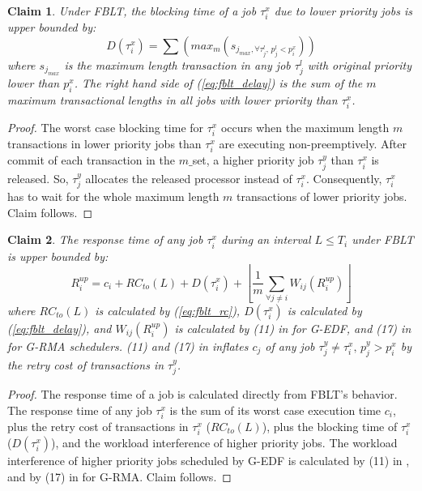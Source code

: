 \documentclass[conference,letterpaper]{IEEEtran}
\newtheorem{clm}{Claim}
\begin{document}
%
\begin{clm}
Under FBLT, the blocking time of a job $\tau_{i}^{x}$ due to lower priority
jobs is upper bounded by: 
\begin{equation}
D(\tau_{i}^{x})=\sum \left(max_{m}(s_{j_{max},\forall\tau_{j}^{l},\, p_{j}^{l}<p_{i}^{x}})\right)\label{eq:fblt_delay}
\end{equation}
where $s_{j_{max}}$ is the maximum length transaction in any job
$\tau_{j}^{l}$ with original priority lower than $p_{i}^{x}$. The
right hand side of (\ref{eq:fblt_delay}) is the sum of the $m$
maximum transactional lengths in all jobs with lower priority than
$\tau_{i}^{x}$.
\end{clm}
%
\begin{proof}
The worst case blocking time for $\tau_{i}^{x}$ occurs when the maximum length $m$ transactions in lower priority jobs than $\tau_{i}^{x}$ are executing non-preemptively. After commit of each transaction in the $m\_$set, a higher priority job $\tau_j^y$ than $\tau_i^x$ is released. So, $\tau_j^y$ allocates the released processor instead of $\tau_i^x$. Consequently, $\tau_i^x$ has to wait for the whole maximum length $m$ transactions of lower priority jobs. Claim follows.

\end{proof}
%
\begin{clm}
The response time of any job $\tau_{i}^{x}$ during an interval $L\le T_{i}$
under FBLT is upper bounded by:
\begin{equation}
R_{i}^{up}=c_{i}+RC_{to}(L)+D(\tau_{i}^{x})+\left\lfloor \frac{1}{m}\sum_{\forall j\ne i}W_{ij}(R_{i}^{up})\right\rfloor \label{eq:fblt_res_time}
\end{equation}
where $RC_{to}(L)$ is calculated by (\ref{eq:fblt_rc}), $D(\tau_{i}^{x})$
is calculated by (\ref{eq:fblt_delay}), and $W_{ij}(R_{i}^{up})$
is calculated by (11) in \cite{stmconcurrencycontrol:emsoft11} for
G-EDF, and (17) in \cite{stmconcurrencycontrol:emsoft11} for G-RMA schedulers.
(11) and (17) in \cite{stmconcurrencycontrol:emsoft11} inflates $c_{j}$
of any job $\tau_{j}^y\ne\tau_{i}^x,\, p_{j}^y>p_{i}^x$ by the retry cost
of transactions in $\tau_{j}^y$.
\end{clm}
%
\begin{proof}
The response time of a job is calculated directly from FBLT's behavior. The response time of any job $\tau_{i}^{x}$ is the sum of its
worst case execution time $c_{i}$, plus the retry cost of transactions
in $\tau_{i}^{x}$ ($RC_{to}(L)$), plus the blocking time of $\tau_{i}^{x}$
($D(\tau_{i}^{x})$), and the workload interference of higher priority
jobs. The workload interference of higher priority jobs scheduled by
G-EDF is calculated by (11) in \cite{stmconcurrencycontrol:emsoft11},
and by (17) in \cite{stmconcurrencycontrol:emsoft11} for G-RMA. Claim follows.
\end{proof}
%
\end{document}

